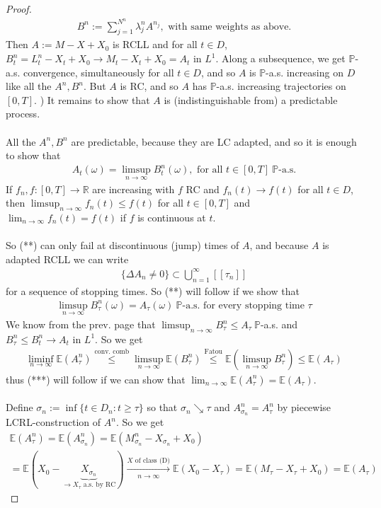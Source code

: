 \documentclass[12pt,a4paper, twoside]{article}
\theoremstyle{definition}
\newcommand{\EE}{\mathbb{E}} %
\newcommand{\PP}{\mathbb{P}} %
\begin{document}
\begin{proof}
\begin{align*}
B^n := \sum_{j=1}^{N^n} \lambda_j^n A^{n_j}, \text{ with same weights as above}. 
\end{align*}
Then $A:= M-X+X_0$ is RCLL and for all $t \in D$, $B_t^n = L_t^n-X_t + X_0 \to M_t-X_t + X_0 = A_t$ in $L^1$. Along a subsequence, we get $\PP$-a.s. convergence, simultaneously for all $t \in D$, and so $A$ is $\PP$-a.s. increasing on $D$ like all the $A^n, B^n$. But $A$ is RC, and so $A$ has $\PP$-a.s. increasing trajectories on $[0,T]$. 
\newpage
{}) It remains to show that $A$ is (indistinguishable from) a predictable process. 
\\\\
All the $A^n, B^n$ are predictable, because they are LC adapted, and so it is enough to show that 
\begin{align*}
A_t( \omega) = \limsup_{n \to \infty} B_t^n ( \omega), \text{ for all } t \in [0,T] \ \PP\text{-a.s.} \tag{**}
\end{align*}
If $f_n, f : [0,T] \to \mathbb{R}$ are increasing with $f$ RC and $f_n(t) \to f(t)$ for all $t \in D$, then $\limsup_{n \to \infty} f_n(t) \leq f(t)$ for all $t \in [0,T]$ and $\lim_{n \to \infty} f_n(t) = f(t)$ if $f$ is continuous at $t$. \\
\\
So (**) can only fail at discontinuous (jump) times of $A$, and because $A$ is adapted RCLL we can write 
\begin{align*}
\{ \Delta A_n \neq 0\} \subset \bigcup_{n=1}^\infty [\![ \tau_n ]\!]
\end{align*}
for a sequence of stopping times. So (**) will follow if we show that 
\begin{align*}
\limsup_{n \to \infty} B_\tau^n( \omega) = A_\tau ( \omega) \ \PP\text{-a.s. for every stopping time } \tau \tag{***}
\end{align*}
We know from the prev. page that $\limsup_{n \to \infty} B_\tau^n \leq A_\tau \ \PP$-a.s. and $B_\tau^n \leq B_t^n \to A_t$ in $L^1$. So we get 
\begin{align*}
\liminf_{n \to \infty} \EE(A_\tau^n) \overset{\text{conv. comb}}\leq \limsup_{n \to \infty} \EE( B_\tau^n) \overset{\text{Fatou}}\leq \EE( \limsup_{n \to \infty} B_\tau^n) \leq \EE(A_\tau)
\end{align*}
thus (***) will follow if we can show that $\lim_{n \to \infty} \EE( A_\tau^n)= \EE(A_\tau)$. \\
\\
Define $\sigma_n:= \inf \{ t \in D_n : t \geq \tau \}$ so that $\sigma_n \searrow \tau$ and $A_{\sigma_n}^n = A_\tau^n$ by piecewise LCRL-construction of $A^n$. So we  get 
\begin{align*}
\EE(A_\tau^n) = \EE(A_{\sigma_n}^n) = \EE( M_{\sigma_n}^n - X_{\sigma_n} + X_0)  \\
= \EE( X_0 - \underbrace{X_{\sigma_n}}_{ \to X_\tau \text{ a.s. by RC}}) \xrightarrow[n \to \infty]{X \text{ of class (D)}} \EE(X_0-X_\tau)= \EE(M_\tau-X_\tau + X_0)= \EE( A_\tau) 
\end{align*}
\end{proof}
\end{document}
